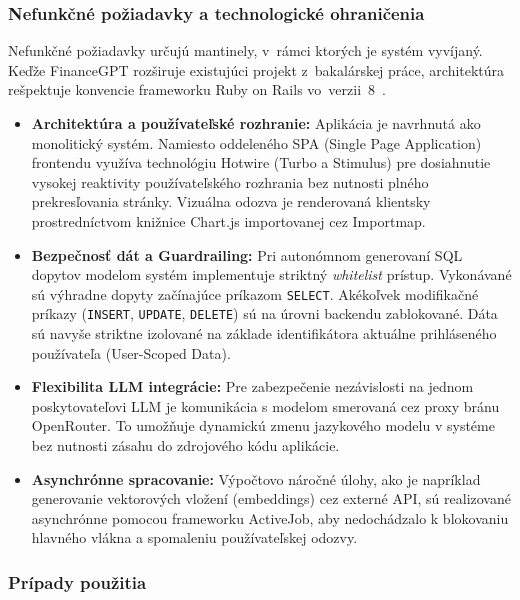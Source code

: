 \subsubsection{Nefunkčné požiadavky a technologické ohraničenia}
Nefunkčné požiadavky určujú mantinely, v~rámci ktorých je systém vyvíjaný. Keďže FinanceGPT
rozširuje existujúci projekt z~bakalárskej práce, architektúra rešpektuje
konvencie frameworku Ruby on Rails vo~verzii~8~\cite{ruby2025}.

\begin{itemize}
	\item \textbf{Architektúra a používateľské rozhranie:} Aplikácia je navrhnutá
		ako monolitický systém. Namiesto oddeleného SPA (Single Page Application) frontendu
		využíva technológiu Hotwire (Turbo a Stimulus) pre dosiahnutie vysokej reaktivity
		používateľského rozhrania bez nutnosti plného prekresľovania stránky.
		Vizuálna odozva je renderovaná klientsky prostredníctvom knižnice Chart.js
		importovanej cez Importmap.

	\item \textbf{Bezpečnosť dát a Guardrailing:} Pri autonómnom generovaní SQL
		dopytov modelom systém implementuje striktný \textit{whitelist} prístup.
		Vykonávané sú výhradne dopyty začínajúce príkazom \texttt{SELECT}. Akékoľvek
		modifikačné príkazy (\texttt{INSERT}, \texttt{UPDATE}, \texttt{DELETE}) sú na
		úrovni backendu zablokované. Dáta sú navyše striktne izolované na základe
		identifikátora aktuálne prihláseného používateľa (User-Scoped Data).

	\item \textbf{Flexibilita LLM integrácie:} Pre zabezpečenie nezávislosti na
		jednom poskytovateľovi LLM je komunikácia s modelom smerovaná cez proxy
		bránu OpenRouter. To umožňuje dynamickú zmenu jazykového modelu v systéme bez
		nutnosti zásahu do zdrojového kódu aplikácie.

	\item \textbf{Asynchrónne spracovanie:} Výpočtovo náročné úlohy, ako je napríklad
		generovanie vektorových vložení (embeddings) cez externé API, sú realizované
		asynchrónne pomocou frameworku ActiveJob, aby nedochádzalo k blokovaniu hlavného
		vlákna a spomaleniu používateľskej odozvy.
\end{itemize}

\subsubsection{Prípady použitia}

